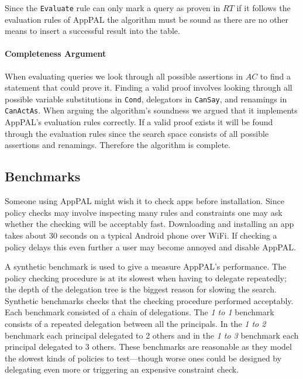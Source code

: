 \documentclass[thesis.tex]{subfiles}
\begin{document}
Since the \texttt{Evaluate} rule can only mark a query as proven in $RT$ if it
follows the evaluation rules of AppPAL the algorithm must be sound as there are
no other means to insert a successful result into the table.

\paragraph*{Completeness Argument}

When evaluating queries we look through all possible assertions in $AC$ to find
a statement that could prove it. Finding a valid proof involves looking through
all possible variable substitutions in \texttt{Cond}, delegators in
\texttt{CanSay}, and renamings in \texttt{CanActAs}. When arguing the
algorithm's soundness we argued that it implements AppPAL's evaluation rules
correctly. If a valid proof exists it will be found through the evaluation rules
since the search space consists of all possible assertions and renamings.
Therefore the algorithm is complete.

\subsection{Benchmarks}
\label{ssec:benchmarks}

Someone using AppPAL might wish it to check apps before installation. Since
policy checks may involve inspecting many rules and constraints one may ask
whether the checking will be acceptably fast. Downloading and installing an app
takes about 30 seconds on a typical Android phone over WiFi. If checking a
policy delays this even further a user may become annoyed and disable AppPAL.

A synthetic benchmark is used to give a measure AppPAL's performance. The policy
checking procedure is at its slowest when having to delegate repeatedly; the
depth of the delegation tree is the biggest reason for slowing the search.
Synthetic benchmarks checks that the checking procedure performed acceptably.
Each benchmark consisted of a chain of delegations. The \emph{1 to 1} benchmark
consists of a repeated delegation between all the principals. In the \emph{1 to
2} benchmark each principal delegated to 2 others and in the \emph{1 to 3}
benchmark each principal delegated to 3 others. These benchmarks are reasonable
as they model the slowest kinds of policies to test---though worse ones could be
designed by delegating even more or triggering an expensive constraint check.
\end{document}
